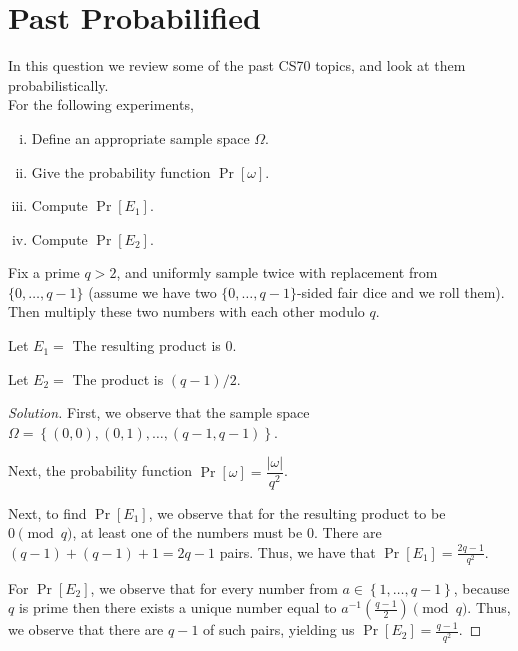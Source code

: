 \documentclass{article}
\newenvironment{solution}{\begin{proof}[Solution]}{\end{proof}}
\begin{document}
\newpage

\section{Past Probabilified}
In this question we review some of the past CS70 topics, and look at them probabilistically.\\
For the following experiments,
\begin{enumerate}[i.]
	\item Define an appropriate sample space $\Omega$.
	\item Give the probability function $\Pr[\omega]$.
	\item Compute $\Pr[E_1]$.
	\item Compute $\Pr[E_2]$.
\end{enumerate}

\begin{hw}
	Fix a prime $q>2$, and uniformly sample twice with replacement from
	$\{0, \dots, q-1\}$ (assume we have two $\{0, \dots, q-1\}$-sided fair dice and we roll them). Then multiply these two numbers with each other modulo $q$.
	
	Let $E_1 =$ The resulting product is $0$.
	
	Let $E_2 =$ The product is $(q-1)/2$.
\end{hw}
\begin{solution}
	First, we observe that the sample space $\Omega = \left\{  (0,0), (0,1), \ldots, (q-1, q-1) \right\}$.
	
	Next, the probability function $\Pr[\omega] = \dfrac{\lvert \omega \rvert}{q^{2}}$.
	
	Next, to find $\Pr[E_{1}]$, we observe that for the resulting product to be $0 \pmod{q}$, at least one of the numbers must be $0$. There are $(q-1) + (q-1) + 1 = 2q - 1$ pairs. Thus, we have that $\Pr[E_{1}] = \frac{2q-1}{q^{2}}$.
	
	For $\Pr[E_{2}]$, we observe that for every number from $a \in \left\{  1, \ldots, q-1\right\}$, because $q$ is prime then there exists a unique number equal to $a^{-1}\left( \frac{q-1}{2} \right) \pmod{q}$. Thus, we observe that there are $q-1$ of such pairs, yielding us $\Pr[E_{2}] = \frac{q-1}{q^{2}}$.
\end{solution}
\end{document}
